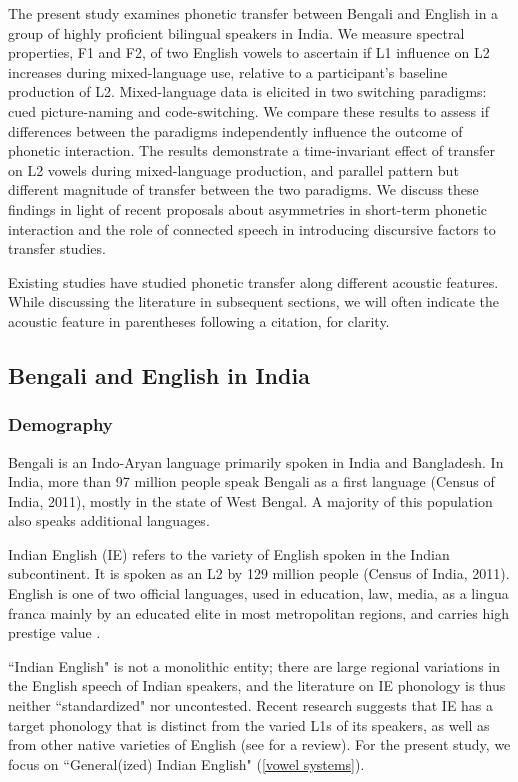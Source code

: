 \documentclass[12 pt]{article}
\begin{document}
The present study examines phonetic transfer between Bengali and English in a group of highly proficient bilingual speakers in India. We measure spectral properties, F1 and F2, of two English vowels to ascertain if L1 influence on L2 increases during mixed-language use, relative to a participant's baseline production of L2. Mixed-language data is elicited in two switching paradigms: cued picture-naming and code-switching. We compare these results to assess if differences between the paradigms independently influence the outcome of phonetic interaction. The results demonstrate a time-invariant effect of transfer on L2 vowels during mixed-language production, and parallel pattern but different magnitude of transfer between the two paradigms. We discuss these findings in light of recent proposals about asymmetries in short-term phonetic interaction and the role of connected speech in introducing discursive factors to transfer studies.

Existing studies have studied phonetic transfer along different acoustic features. While discussing the literature in subsequent sections, we will often indicate the acoustic feature in parentheses following a citation, for clarity. 

\subsection{Bengali and English in India} \label{bengali_english_in_india}

\subsubsection*{Demography} 

Bengali is an Indo-Aryan language primarily spoken in India and Bangladesh. In India, more than 97 million people speak Bengali as a first language (Census of India, 2011), mostly in the state of West Bengal. A majority of this population also speaks additional languages.

Indian English (IE) refers to the variety of English spoken in the Indian subcontinent. It is spoken as an L2 by 129 million people (Census of India, 2011).  English is one of two official languages, used in education, law, media, as a lingua franca mainly by an educated elite in most metropolitan regions, and carries high prestige value \citep{pandey201517, kachru1981english, tollefson2014language, kachru1983indianization}.

``Indian English" is not a monolithic entity; there are large regional variations in the English speech of Indian speakers, and the literature on IE phonology is thus neither ``standardized" nor uncontested. Recent research suggests that IE has a target phonology that is distinct from the varied L1s of its speakers, as well as from other native varieties of English (see \cite{sirsa2013effects} for a review). For the present study, we focus on ``General(ized) Indian English" \citep{masica1972sound} (\ref{vowel systems}). 
\end{document}
